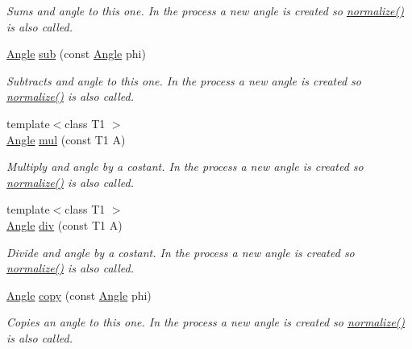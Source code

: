 \begin{DoxyCompactItemize}
\begin{DoxyCompactList}\small\item\em Sums and angle to this one. In the process a new angle is created so {\ttfamily \mbox{\hyperlink{class_angle_a449fc0638ca2e26b4a57d1cce95788e8}{normalize()}}} is also called. \end{DoxyCompactList}\item 
\mbox{\hyperlink{class_angle}{Angle}} \mbox{\hyperlink{class_angle_a74797d883c7a00259f49a9e5dea01c0d}{sub}} (const \mbox{\hyperlink{class_angle}{Angle}} phi)
\begin{DoxyCompactList}\small\item\em Subtracts and angle to this one. In the process a new angle is created so {\ttfamily \mbox{\hyperlink{class_angle_a449fc0638ca2e26b4a57d1cce95788e8}{normalize()}}} is also called. \end{DoxyCompactList}\item 
{\footnotesize template$<$class T1 $>$ }\\\mbox{\hyperlink{class_angle}{Angle}} \mbox{\hyperlink{class_angle_aa1c4b848f4ac7ece9d2fa010abc91511}{mul}} (const T1 A)
\begin{DoxyCompactList}\small\item\em Multiply and angle by a costant. In the process a new angle is created so {\ttfamily \mbox{\hyperlink{class_angle_a449fc0638ca2e26b4a57d1cce95788e8}{normalize()}}} is also called. \end{DoxyCompactList}\item 
{\footnotesize template$<$class T1 $>$ }\\\mbox{\hyperlink{class_angle}{Angle}} \mbox{\hyperlink{class_angle_accc4f9c0df6965dc1fecab234d30b348}{div}} (const T1 A)
\begin{DoxyCompactList}\small\item\em Divide and angle by a costant. In the process a new angle is created so {\ttfamily \mbox{\hyperlink{class_angle_a449fc0638ca2e26b4a57d1cce95788e8}{normalize()}}} is also called. \end{DoxyCompactList}\item 
\mbox{\hyperlink{class_angle}{Angle}} \mbox{\hyperlink{class_angle_ab1c34d25d3235e639313e5d48d98a6f6}{copy}} (const \mbox{\hyperlink{class_angle}{Angle}} phi)
\begin{DoxyCompactList}\small\item\em Copies an angle to this one. In the process a new angle is created so {\ttfamily \mbox{\hyperlink{class_angle_a449fc0638ca2e26b4a57d1cce95788e8}{normalize()}}} is also called. \end{DoxyCompactList}\item 

\end{DoxyCompactItemize}
